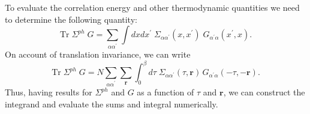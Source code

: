 To evaluate
the correlation energy and other thermodynamic
quantities we need to determine the following quantity:
\begin{equation}
\mathrm{Tr}\;\Sigma^{ph} \; G =
   \sum_{\alpha\alpha^{\prime}} \int dx dx^{\prime}\;
  \Sigma_{\alpha\alpha^{\prime}}(x,x^{\prime})\;
G_{\alpha^{\prime}\alpha}(x^{\prime},x).
\end{equation}
On account of translation invariance, we can write
\begin{equation}
\mathrm{Tr}\;\Sigma^{ph} \; G = N \sum_{\alpha\alpha^{\prime}} 
\sum_{\mathbf{r}} \int_0^{\beta} d\tau \;
\Sigma_{\alpha\alpha^{\prime}}(\tau,\mathbf{r})\,
G_{\alpha^{\prime}\alpha}(-\tau,-\mathbf{r}).
\end{equation}
Thus, having results for $\Sigma^{ph}$ and $G$ as
a function of $\tau$ and $\mathbf{r}$, we can construct
the integrand and evaluate the sums and integral numerically.

